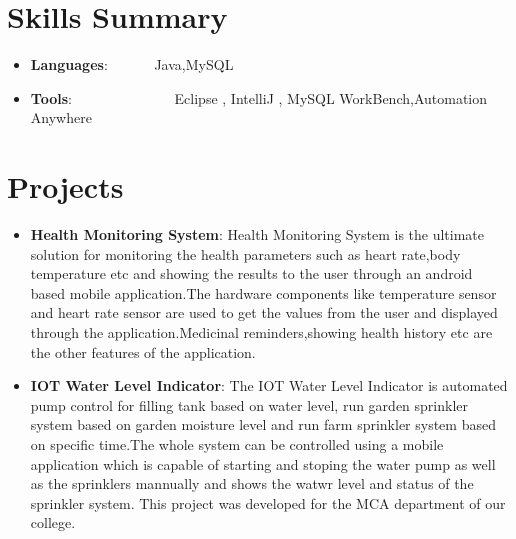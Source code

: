 \documentclass[a4paper,20pt]{article}
\newcommand{\resumeItem}[2]{
	\item\small{
		\textbf{#1}{: #2 \vspace{-2pt}}
	}
}
\newcommand{\resumeSubItem}[2]{\resumeItem{#1}{#2}\vspace{-3pt}}
\newcommand{\resumeSubHeadingListStart}{\begin{itemize}[leftmargin=*]}
\newcommand{\resumeSubHeadingListEnd}{\end{itemize}}
\begin{document}
\vspace{-5pt}
\section{Skills Summary}
	\resumeSubHeadingListStart
		\resumeSubItem{Languages}{~~~~~~Java,MySQL}
		\resumeSubItem{Tools}{~~~~~~~~~~~~~~Eclipse , IntelliJ , MySQL WorkBench,Automation Anywhere}
		
	\resumeSubHeadingListEnd

\vspace{-5pt}
\section{Projects}
	\resumeSubHeadingListStart
		\resumeSubItem{Health Monitoring System}{Health Monitoring System is the ultimate solution for monitoring the health parameters such as heart rate,body temperature etc and showing the results to the user through an android based mobile application.The hardware components like temperature sensor and heart rate sensor  are used to get the values from the user and displayed through the application.Medicinal reminders,showing health history etc are the other features of the application.}
		
		\vspace{2pt}
		\resumeSubItem{IOT Water Level Indicator}{The IOT Water Level Indicator is automated pump control for filling tank based on water level, run garden sprinkler system based on garden moisture level and run farm sprinkler system based on specific time.The whole system can be controlled using a mobile application which is capable of starting and stoping the water pump as well as the sprinklers mannually and shows the watwr level and status of the sprinkler system.  This project was developed for the MCA department of our college.}
		
	\resumeSubHeadingListEnd
\end{document}
